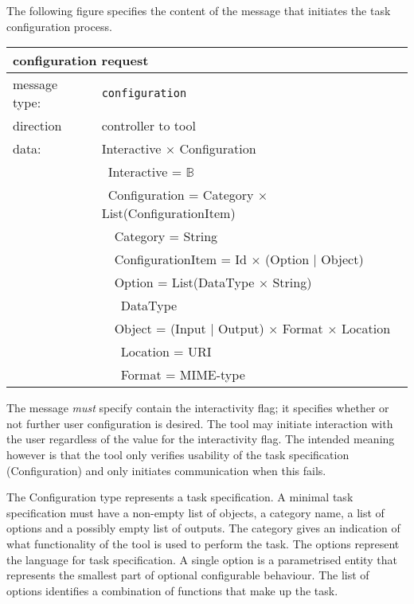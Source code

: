 \documentclass{article}
\newcommand{\msg}[1]{\texttt{#1}}
\begin{document}
   The following figure specifies the content of the message that initiates the
   task configuration process.
   \begin{table}[H]
    \begin{center}
     \begin{tabular}{|ll|}
      \hline
       \multicolumn{2}{|l|}{\textbf{configuration request}} \\
      \hline
       message type:   & \msg{configuration} \\
      \hline
       direction       & controller to tool \\
       data:           & Interactive $\times$ Configuration \\
                       & \ Interactive = $\mathbb{B}$ \\
                       & \ Configuration = Category $\times$ List(ConfigurationItem) \\
                       & \ \ Category = String \\
                       & \ \ ConfigurationItem = Id $\times$ (Option $|$ Object) \\
                       & \ \ Option = List(DataType $\times$ String) \\
                       & \ \ \ DataType \\
                       & \ \ Object = (Input $|$ Output) $\times$ Format $\times$ Location \\
                       & \ \ \ Location = URI \\
                       & \ \ \ Format   = MIME-type \\
      \hline
     \end{tabular}
     \vspace{-0.3cm}
    \end{center}
   \end{table}

   \noindent The message \emph{must} specify contain the interactivity flag; it
   specifies whether or not further user configuration is desired. The tool may
   initiate interaction with the user regardless of the value for the
   interactivity flag. The intended meaning however is that the tool only
   verifies usability of the task specification (Configuration) and only
   initiates communication when this fails.

   The Configuration type represents a task specification. A minimal task
   specification must have a non-empty list of objects, a category name, a list
   of options and a possibly empty list of outputs. The category gives an
   indication of what functionality of the tool is used to perform the task.
   The options represent the language for task specification. A single option
   is a parametrised entity that represents the smallest part of optional
   configurable behaviour. The list of options identifies a combination of
   functions that make up the task. 
\end{document}
